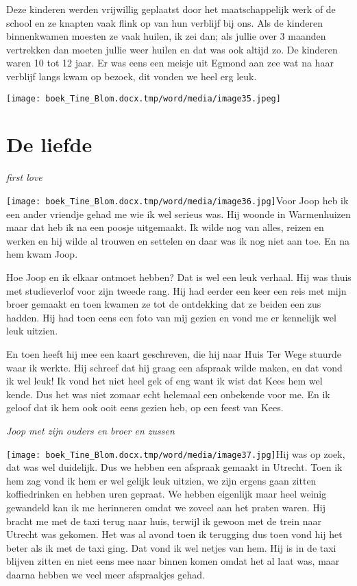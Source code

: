 \documentclass{scrbook}
\begin{document}
{Deze kinderen werden vrijwillig geplaatst door het maatschappelijk werk of de school en ze knapten vaak flink op van hun verblijf bij ons. Als de kinderen binnenkwamen moesten ze vaak huilen, ik zei dan; als jullie over 3 maanden vertrekken dan moeten jullie weer huilen en dat was ook altijd zo. De kinderen waren 10 tot 12 jaar. Er was eens een meisje uit Egmond aan zee wat na haar verblijf langs kwam op bezoek, dit vonden we heel erg leuk. 

\texttt{[image: boek\_Tine\_Blom.docx.tmp/word/media/image35.jpeg]}\newline


\chapter{\label{ref-009}De liefde}

\textit{first love }



 \texttt{[image: boek\_Tine\_Blom.docx.tmp/word/media/image36.jpg]}Voor Joop heb ik een ander vriendje gehad me wie ik wel serieus was. Hij woonde in Warmenhuizen maar dat heb ik na een poosje uitgemaakt. Ik wilde nog van alles, reizen en werken en hij wilde al trouwen en settelen en daar was ik nog niet aan toe. En na hem kwam Joop. 

Hoe Joop en ik elkaar ontmoet hebben? Dat is wel een leuk verhaal. Hij was thuis met studieverlof voor zijn tweede rang. Hij had eerder een keer een reis met mijn broer gemaakt en toen kwamen ze tot de ontdekking dat ze beiden een zus hadden. Hij had toen eens een foto van mij gezien en vond me er kennelijk wel leuk uitzien.

En toen heeft hij mee een kaart geschreven, die hij naar Huis Ter Wege stuurde waar ik werkte. Hij schreef dat hij graag een afspraak wilde maken, en dat vond ik wel leuk! Ik vond het niet heel gek of eng want ik wist dat Kees hem wel kende. Dus het was niet zomaar echt helemaal een onbekende voor me. En ik geloof dat ik hem ook ooit eens gezien heb, op een feest van Kees. 

\textit{Joop met zijn ouders en broer en zussen }



 \texttt{[image: boek\_Tine\_Blom.docx.tmp/word/media/image37.jpg]}Hij was op zoek, dat was wel duidelijk. Dus we hebben een afspraak gemaakt in Utrecht. Toen ik hem zag vond ik hem er wel gelijk leuk uitzien, we zijn ergens gaan zitten koffiedrinken en hebben uren gepraat. We hebben eigenlijk maar heel weinig gewandeld kan ik me herinneren omdat we zoveel aan het praten waren. Hij bracht me met de taxi terug naar huis, terwijl ik gewoon met de trein naar Utrecht was gekomen. Het was al avond toen ik terugging dus toen vond hij het beter als ik met de taxi ging. Dat vond ik wel netjes van hem. Hij is in de taxi blijven zitten en niet eens mee naar binnen komen omdat het al laat was, maar daarna hebben we veel meer afspraakjes gehad. 

}
\end{document}
